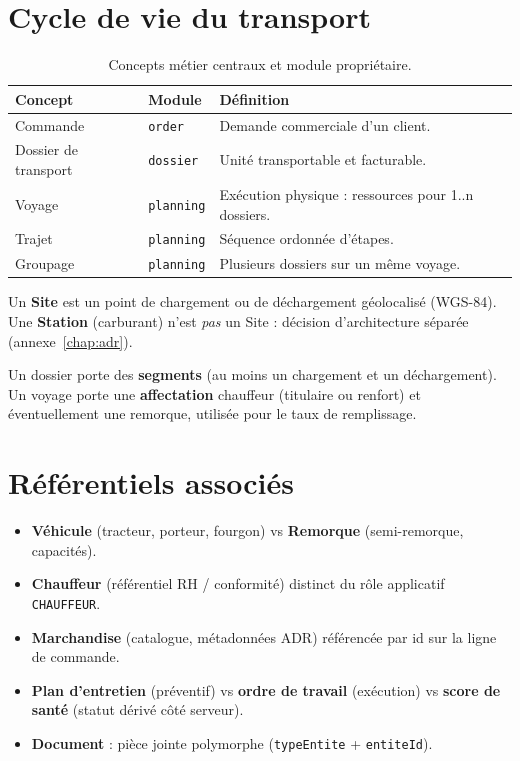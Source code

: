 \section{Cycle de vie du transport}

\begin{table}[ht]
\centering
\caption{Concepts métier centraux et module propriétaire.}
\label{tab:concepts}
\begin{tabular}{@{}llp{6.2cm}@{}}
\toprule
Concept & Module & Définition \\
\midrule
Commande & \texttt{order} & Demande commerciale d'un client. \\
Dossier de transport & \texttt{dossier} & Unité transportable et facturable. \\
Voyage & \texttt{planning} & Exécution physique : ressources pour 1..n dossiers. \\
Trajet & \texttt{planning} & Séquence ordonnée d'étapes. \\
Groupage & \texttt{planning} & Plusieurs dossiers sur un même voyage. \\
\bottomrule
\end{tabular}
\end{table}

Un \textbf{Site} est un point de chargement ou de déchargement géolocalisé (WGS-84). Une \textbf{Station} (carburant) n'est \emph{pas} un Site : décision d'architecture séparée (annexe~\ref{chap:adr}).

Un dossier porte des \textbf{segments} (au moins un chargement et un déchargement). Un voyage porte une \textbf{affectation} chauffeur (titulaire ou renfort) et éventuellement une remorque, utilisée pour le taux de remplissage.

\section{Référentiels associés}

\begin{itemize}[leftmargin=*]
  \item \textbf{Véhicule} (tracteur, porteur, fourgon) vs \textbf{Remorque} (semi-remorque, capacités).
  \item \textbf{Chauffeur} (référentiel RH / conformité) distinct du rôle applicatif \texttt{CHAUFFEUR}.
  \item \textbf{Marchandise} (catalogue, métadonnées ADR) référencée par id sur la ligne de commande.
  \item \textbf{Plan d'entretien} (préventif) vs \textbf{ordre de travail} (exécution) vs \textbf{score de santé} (statut dérivé côté serveur).
  \item \textbf{Document} : pièce jointe polymorphe (\texttt{typeEntite} + \texttt{entiteId}).
\end{itemize}

